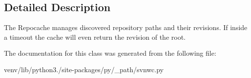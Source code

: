\subsection{Detailed Description}
\begin{DoxyVerb}The Repocache manages discovered repository paths
and their revisions.  If inside a timeout the cache
will even return the revision of the root.
\end{DoxyVerb}
 

The documentation for this class was generated from the following file\+:\begin{DoxyCompactItemize}
\item 
venv/lib/python3./site-\/packages/py/\+\_\+path/svnwc.\+py\end{DoxyCompactItemize}

